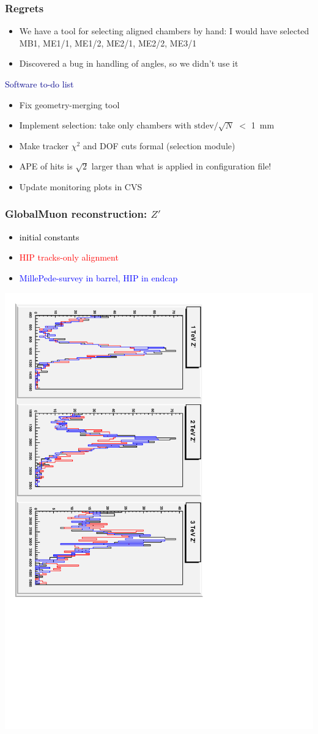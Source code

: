 \documentclass[compress]{beamer}
\begin{document}
\begin{frame}
\frametitle{Regrets}

\begin{itemize}
\item We have a tool for selecting aligned chambers by hand: I would have selected MB1, ME1/1, ME1/2, ME2/1, ME2/2, ME3/1
\item Discovered a bug in handling of angles, so we didn't use it
\end{itemize}

\vfill
\hspace{-0.83 cm} \textcolor{darkblue}{\Large Software to-do list}
\begin{itemize}
\item Fix geometry-merging tool
\item Implement selection: take only chambers with $\mbox{stdev}/\sqrt{N}$ $<$ 1~mm
\item Make tracker $\chi^2$ and DOF cuts formal (selection module)
\item APE of hits is $\sqrt{2}$ larger than what is applied in configuration file!
\item Update monitoring plots in CVS
\end{itemize}

\end{frame}

\begin{frame}
\frametitle{GlobalMuon reconstruction: $Z'$}

\begin{itemize}
\item \textcolor{black}{initial constants}
\item \textcolor{red}{HIP tracks-only alignment}
\item \textcolor{blue}{MillePede-survey in barrel, HIP in endcap}
\end{itemize}

\begin{center}
\includegraphics[height=0.9\linewidth, angle=90]{zprime_mass.pdf}
\end{center}
\end{frame}
\end{document}
